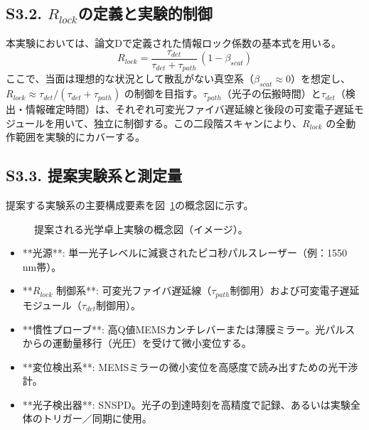 \documentclass[a4paper,12pt]{article}
\begin{document}
\subsection*{S3.2. $R_{lock}$の定義と実験的制御}
\label{subsec:supp_exp_rlock_control}

本実験においては、論文Dで定義された情報ロック係数の基本式を用いる。
\begin{equation}
    R_{lock} = \frac{\tau_{det}}{\tau_{det}+\tau_{path}}\,(1-\beta_{scat})
    \label{eq:supp_rlock_experimental}
\end{equation}
ここで、当面は理想的な状況として散乱がない真空系（$\beta_{scat} \approx 0$）を想定し、$R_{lock} \approx \tau_{det} / (\tau_{det}+\tau_{path})$ の制御を目指す。$\tau_{path}$（光子の伝搬時間）と$\tau_{det}$（検出・情報確定時間）は、それぞれ可変光ファイバ遅延線と後段の可変電子遅延モジュールを用いて、独立に制御する。この二段階スキャンにより、$R_{lock}$ の全動作範囲を実験的にカバーする。

\subsection*{S3.3. 提案実験系と測定量}
\label{subsec:supp_exp_setup_measurement}

提案する実験系の主要構成要素を図~\ref{fig:supp_exp_setup_schematic}の概念図に示す。
\begin{figure}[H]
    \centering
    \caption{提案される光学卓上実験の概念図（イメージ）。}
    \label{fig:supp_exp_setup_schematic}
\end{figure}

\begin{itemize}
    \item **光源**: 単一光子レベルに減衰されたピコ秒パルスレーザー（例：1550 nm帯）。
    \item **$R_{lock}$ 制御系**: 可変光ファイバ遅延線（$\tau_{path}$制御用）および可変電子遅延モジュール（$\tau_{det}$制御用）。
    \item **慣性プローブ**: 高Q値MEMSカンチレバーまたは薄膜ミラー。光パルスからの運動量移行（光圧）を受けて微小変位する。
    \item **変位検出系**: MEMSミラーの微小変位を高感度で読み出すための光干渉計。
    \item **光子検出器**: SNSPD。光子の到達時刻を高精度で記録、あるいは実験全体のトリガー／同期に使用。
\end{itemize}
\end{document}
